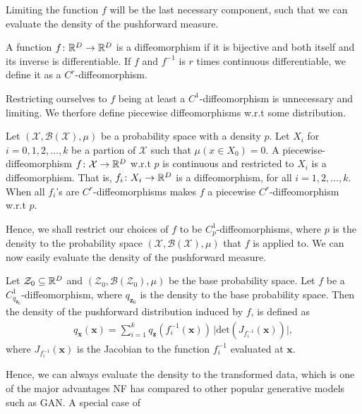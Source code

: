 Limiting the function \(f\) will be the last necessary component, such that we can evaluate 
the density of the pushforward measure.
\begin{definition}
    A function \(f\colon \mathbb{R}^D \to \mathbb{R}^D\) is a diffeomorphism if it is bijective and 
    both itself and its inverse is differentiable. If \(f\) and \(f^{-1}\) is \(r\) times continuous
    differentiable, we define it as a \(C^r\)-diffeomorphism. 
\end{definition}
Restricting ourselves to \(f\) being at least a \(C^1\)-diffeomorphism is unnecessary and limiting.
We therfore define piecewise diffeomorphisms w.r.t some distribution. 
\begin{definition}
    Let \((\mathcal{X},\mathscr{B}(\mathcal{X}), \mu)\) be a probability space 
    with a density \(p\). Let \(X_i\) for \(i=0,1,2,\dots,k\) be a partion of \(\mathcal{X}\)
    such that \(\mu(x \in X_0) = 0\). A piecewise-diffeomorphism \(f\colon \mathcal{X} \rightarrow \mathbb{R}^D\) 
    w.r.t \(p\) is continuous and restricted to \(X_i\) is a diffeomorphism. That is, 
    \(f_i \colon X_i \rightarrow \mathbb{R}^D\) is a diffeomorphism, for all \(i=1,2,\dots,k\). When
    all \(f_i\)'s are \(C^r\)-diffeomorphisms makes \(f\) a piecewise \(C^r\)-diffeomorphism w.r.t \(p\).
\end{definition}
Hence, we shall restrict our choices of \(f\) to be \(C^1_p\)-diffeomorphisms, where \(p\)
is the density to the probability space \((\mathcal{X}, \mathscr{B}(\mathcal{X}), \mu)\) that \(f\) 
is applied to.
We can now easily evaluate the density of the pushforward measure.
\begin{theorem}\label{thm:trans}
    Let \(\mathcal{Z}_0 \subseteq \mathbb{R}^D\) and 
    \((\mathcal{Z}_0, \mathscr{B}(\mathcal{Z}_0), \mu)\) be the base probability space.
    Let \(f\) be a \(C_{q_{\bm z_0}}^1\)-diffeomorphism, where \(q_{\bm z_0}\) is 
    the density to the base probability space.
    Then the density of the pushforward distribution induced by \(f\), is defined as
    \begin{align}\label{eq:trans}
        q_{\bm{x}}(\bm{x}) = \sum_{i=1}^k q_{\bm{z}}(f_i^{-1}(\bm{x})) \, \lvert 
        \text{det}(J_{f_i^{-1}}(\bm x))\rvert,
    \end{align}
    where \(J_{f_i^{-1}}(\bm x)\) is the Jacobian to the function \(f_i^{-1}\) evaluated at \(\bm x\).
\end{theorem}
Hence, we can always evaluate the density to the transformed data, which is one of the
major advantages NF has compared to other popular generative models such as GAN. A special case of 
